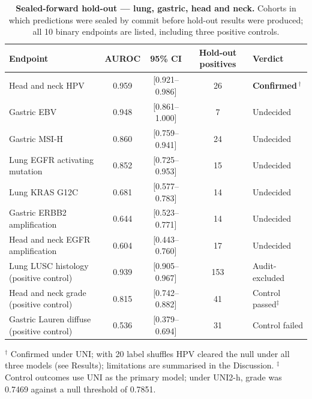 \documentclass[a4paper,10pt,twocolumn]{extarticle}
\begin{document}
\begin{table}[t]
\centering
\scriptsize
\caption{\textbf{Sealed-forward hold-out --- lung, gastric, head and neck.}
Cohorts in which predictions were sealed by commit before hold-out results were
produced; all 10 binary endpoints are listed, including three positive controls.}
\begin{tabular}{@{}lcccl@{}}
\toprule
\textbf{Endpoint} & \textbf{AUROC} & \textbf{95\% CI} & \textbf{Hold-out positives} & \textbf{Verdict} \\
\midrule
Head and neck HPV            & 0.959 & [0.921--0.986] & 26  & \textbf{Confirmed}\,$^\dagger$ \\
Gastric EBV & 0.948 & [0.861--1.000] & 7 & Undecided \\
Gastric MSI-H                & 0.860 & [0.759--0.941] & 24  & Undecided \\
Lung EGFR activating mutation & 0.852 & [0.725--0.953] & 15  & Undecided \\
Lung KRAS G12C               & 0.681 & [0.577--0.783] & 14  & Undecided \\
Gastric ERBB2 amplification  & 0.644 & [0.523--0.771] & 14  & Undecided \\
Head and neck EGFR amplification & 0.604 & [0.443--0.760] & 17 & Undecided \\
Lung LUSC histology (positive control) & 0.939 & [0.905--0.967] & 153 & Audit-excluded \\
Head and neck grade (positive control) & 0.815 & [0.742--0.882] & 41 & Control passed$^\ddagger$ \\
Gastric Lauren diffuse (positive control) & 0.536 & [0.379--0.694] & 31 & Control failed \\
\bottomrule
\end{tabular}

\vspace{2pt}
\begin{minipage}{0.92\textwidth}
\scriptsize $^\dagger$ Confirmed under UNI; with 20 label shuffles HPV cleared the null under all three models (see Results); limitations are summarised in the Discussion. $^\ddagger$ Control outcomes use UNI as the primary model; under UNI2-h, grade was 0.7469 against a null threshold of 0.7851.
\end{minipage}
\end{table}
\end{document}
